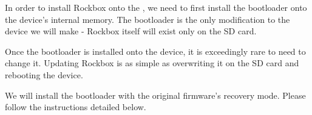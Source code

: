 In order to install Rockbox onto the \dap{}, we need to first install the bootloader
onto the device's internal memory. The bootloader is the only modification to the device
we will make - Rockbox itself will exist only on the SD card.

Once the bootloader is installed onto the device, it is exceedingly rare to need to change it.
Updating Rockbox is as simple as overwriting it on the SD card and rebooting the device.

We will install the bootloader with the original firmware's recovery
mode. Please follow the instructions detailed below.



